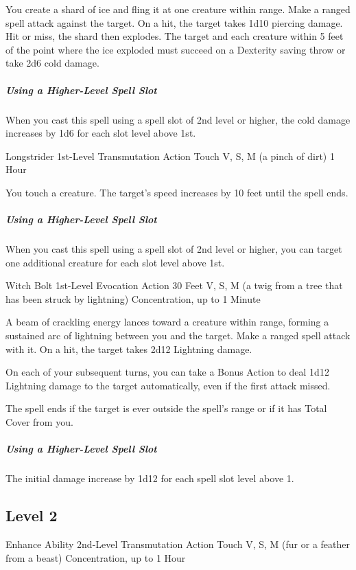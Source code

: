 \documentclass[letterpaper,openany,oneside,twocolumn]{book}
\begin{document}
You create a shard of ice and fling it at one creature within range. Make a ranged spell attack against the target. On a hit, the target takes 1d10 piercing damage. Hit or miss, the shard then explodes. The target and each creature within 5 feet of the point where the ice exploded must succeed on a Dexterity saving throw or take 2d6 cold damage.

\subparagraph*{Using a Higher-Level Spell Slot} When you cast this spell using a spell slot of 2nd level or higher, the cold damage increases by 1d6 for each slot level above 1st.

\DndSpellHeader
  {Longstrider}
  {1st-Level Transmutation}
  {Action}
  {Touch}
  {V, S, M (a pinch of dirt)}
  {1 Hour}

You touch a creature. The target's speed increases by 10 feet until the spell ends.

\subparagraph*{Using a Higher-Level Spell Slot} When you cast this spell using a spell slot of 2nd level or higher, you can target one additional creature for each slot level above 1st.

\DndSpellHeader
  {Witch Bolt}
  {1st-Level Evocation}
  {Action}
  {30 Feet}
  {V, S, M (a twig from a tree that has been struck by lightning)}
  {Concentration, up to 1 Minute}

A beam of crackling energy lances toward a creature within range, forming a sustained arc of lightning between you and the target. Make a ranged spell attack with it. On a hit, the target takes 2d12 Lightning damage.

On each of your subsequent turns, you can take a Bonus Action to deal 1d12 Lightning damage to the target automatically, even if the first attack missed.

The spell ends if the target is ever outside the spell's range or if it has Total Cover from you.

\subparagraph*{Using a Higher-Level Spell Slot} The initial damage increase by 1d12 for each spell slot level above 1.

\subsection*{Level 2}

\DndSpellHeader
  {Enhance Ability}
  {2nd-Level Transmutation}
  {Action}
  {Touch}
  {V, S, M (fur or a feather from a beast)}
  {Concentration, up to 1 Hour}
\end{document}

